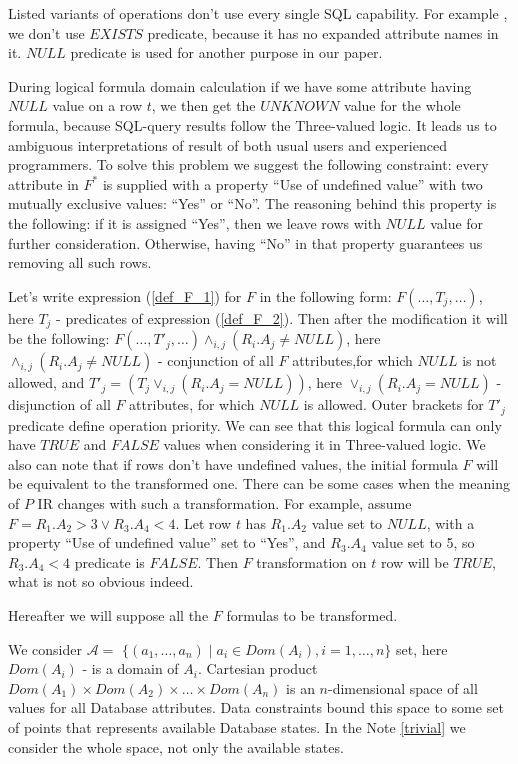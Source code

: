 \documentclass[10pt,a4paper]{article}
\def \n #1{\mathit{#1}}
\begin{document}
Listed variants of operations don't use every single SQL capability. For example
, we don't use $\n{EXISTS}$ predicate, because it has no expanded attribute
names in it. $\n{NULL}$ predicate is used for another purpose in our paper.

During logical formula domain calculation if we have some attribute having
$NULL$ value on a row $t$, we then get the $\n{UNKNOWN}$ value for the whole
formula, because SQL-query results follow the Three-valued logic. It leads us to
ambiguous interpretations of result of both usual users and experienced
programmers. To solve this problem we suggest the following constraint: every
attribute in $F^{\ast}$ is supplied with a property ``Use of undefined value''
with two mutually exclusive values: ``Yes'' or ``No''. The reasoning behind
this property is the following: if it is assigned ``Yes'', then we leave rows
with $\n{NULL}$ value for further consideration. Otherwise, having ``No'' in
that property guarantees us removing all such rows.

Let's write expression (\ref{def_F_1}) for $F$ in the following form: $ F (\dots
, T_j , \dots )$, here $T_j$ - predicates of expression (\ref{def_F_2}).
Then after the modification it will be the following: 
$F( \dots, T'_j , \dots )\wedge_{i,j}(R_i .A_j \neq  \n{NULL})$, here
$\wedge_{i,j}(R_i .A_j \neq  \n{NULL})$ - conjunction of all $F$ attributes,for
which $\n{NULL}$ is not allowed, and $T'_j = (T_j \vee_{i,j}(R_i .A_j =
\n{NULL}))$, here  $\vee_{i,j}(R_i .A_j = \n{NULL})$ - disjunction of all $F$
attributes, for which $\n{NULL}$ is allowed. Outer brackets for $T'_j$ predicate
define operation priority. We can see that this logical formula can only have
$\n{TRUE}$ and $\n{FALSE}$ values when considering it in Three-valued logic. We
also can note that if rows don't have undefined values, the initial formula $F$
will be equivalent to the transformed one. There can be some cases when the
meaning of $P$ IR changes with such a transformation. For example, assume $F =
R_1 .A_2 > 3 \vee R_3 .A_4 < 4$. Let row $t$ has $R_1 .A_2$ value set to
$\n{NULL}$, with a property ``Use of undefined value'' set to ``Yes'', and $R_3
.A_4$ value set to 5, so $R_3 .A_4 < 4$ predicate is $\n{FALSE}$. Then $F$
transformation on $t$ row will be $\n{TRUE}$, what is not so obvious indeed.

Hereafter we will suppose all the $F$ formulas to be transformed.

We consider $\mathcal{A} =$ $\{(a_1, \dots, a_n)
\mid a_i \in Dom(A_i), i=1,\dots,n\}$ set, here $Dom(A_i)$ - is a domain of
$A_i$. Cartesian product $Dom(A_1)\times Dom(A_2)\times \dots \times Dom(A_n)$
is an $n$-dimensional space of all values for all Database attributes. Data
constraints bound this space to some set of points that represents available
Database states. In the Note \ref{trivial} we consider the whole space, not only
the available states.
\end{document}
